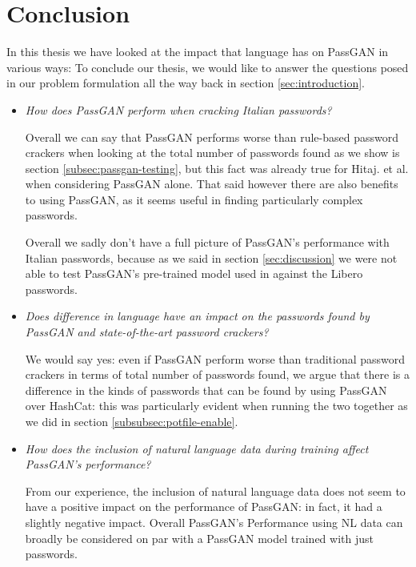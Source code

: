 \section{Conclusion}
In this thesis we have looked at the impact that language has on PassGAN in various ways:
To conclude our thesis, we would like to answer the questions posed in our problem formulation all the way back in section \ref{sec:introduction}.

\begin{itemize}
\item \emph{How does PassGAN perform when cracking Italian passwords?} %

Overall we can say that PassGAN performs worse than rule-based password crackers when looking at the total number of passwords found as we show is section \ref{subsec:passgan-testing}, but this fact was already true for Hitaj. et al. \cite{PassGAN} when considering PassGAN alone.
That said however there are also benefits to using PassGAN, as it seems useful in finding particularly complex passwords.

Overall we sadly don't have a full picture of PassGAN's performance with Italian passwords, because as we said in section \ref{sec:discussion} we were not able to test PassGAN's pre-trained model used in \cite{PassGAN} against the Libero passwords.

\item \emph{Does difference in language have an impact on the passwords found by PassGAN and state-of-the-art password crackers?}

We would say yes: even if PassGAN perform worse than traditional password crackers in terms of total number of passwords found, we argue that there is a difference in the kinds of passwords that can be found by using PassGAN over HashCat: this was particularly evident when running the two together as we did in section \ref{subsubsec:potfile-enable}.      

\item \emph{How does the inclusion of natural language data during training affect PassGAN's performance?}

From our experience, the inclusion of natural language data does not seem to have a positive impact on the performance of PassGAN: in fact, it had a slightly negative impact. Overall PassGAN's Performance using NL data can broadly be considered on par with a PassGAN model trained with just passwords.
 

\end{itemize}
